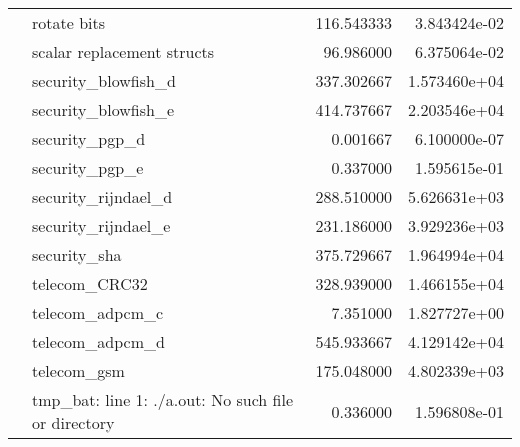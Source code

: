 \begin{table*}
\begin{center}
\begin{tabular}{llrr}
       & rotate bits &    116.543333 &  3.843424e-02 \\
       & scalar replacement structs &     96.986000 &  6.375064e-02 \\
       & security\_blowfish\_d &    337.302667 &  1.573460e+04 \\
       & security\_blowfish\_e &    414.737667 &  2.203546e+04 \\
       & security\_pgp\_d &      0.001667 &  6.100000e-07 \\
       & security\_pgp\_e &      0.337000 &  1.595615e-01 \\
       & security\_rijndael\_d &    288.510000 &  5.626631e+03 \\
       & security\_rijndael\_e &    231.186000 &  3.929236e+03 \\
       & security\_sha &    375.729667 &  1.964994e+04 \\
       & telecom\_CRC32 &    328.939000 &  1.466155e+04 \\
       & telecom\_adpcm\_c &      7.351000 &  1.827727e+00 \\
       & telecom\_adpcm\_d &    545.933667 &  4.129142e+04 \\
       & telecom\_gsm &    175.048000 &  4.802339e+03 \\
       & tmp\_bat: line 1: ./a.out: No such file or directory &      0.336000 &  1.596808e-01 \\
\bottomrule
\end{tabular}
\end{center}
\end{table*}
